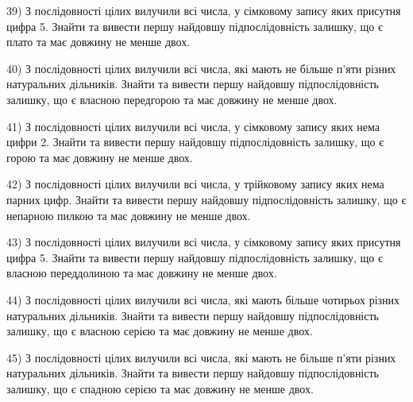 \documentclass[11pt, ukrainian]{article}
\begin{document}
\par
\vspace{0.9cm}
39) \space 
З послідовності цілих вилучили всі числа, у сімковому запису яких присутня цифра 5. Знайти та вивести першу найдовшу підпослідовність залишку, що є плато та має довжину не менше двох.

\par
\vspace{0.9cm}
40) \space 
З послідовності цілих вилучили всі числа, які мають не більше п'яти різних натуральних дільників. Знайти та вивести першу найдовшу підпослідовність залишку, що є власною передгорою та має довжину не менше двох.

\par
\vspace{0.9cm}
41) \space 
З послідовності цілих вилучили всі числа, у сімковому запису яких нема цифри 2. Знайти та вивести першу найдовшу підпослідовність залишку, що є горою та має довжину не менше двох.

\par
\vspace{0.9cm}
42) \space 
З послідовності цілих вилучили всі числа, у трійковому запису яких нема парних цифр. Знайти та вивести першу найдовшу підпослідовність залишку, що є непарною пилкою та має довжину не менше двох.

\par
\vspace{0.9cm}
43) \space 
З послідовності цілих вилучили всі числа, у сімковому запису яких присутня цифра 5. Знайти та вивести першу найдовшу підпослідовність залишку, що є власною переддолиною та має довжину не менше двох.

\par
\vspace{0.9cm}
44) \space 
З послідовності цілих вилучили всі числа, які мають більше чотирьох різних натуральних дільників. Знайти та вивести першу найдовшу підпослідовність залишку, що є власною серією та має довжину не менше двох.

\par
\vspace{0.9cm}
45) \space 
З послідовності цілих вилучили всі числа, які мають не більше п'яти різних натуральних дільників. Знайти та вивести першу найдовшу підпослідовність залишку, що є спадною серією та має довжину не менше двох.
\end{document}
